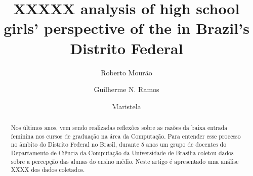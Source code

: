 \documentclass{llncs}
\begin{document}
%
\title{XXXXX analysis of high school girls' perspective of the in Brazil's Distrito Federal}%
%
\author{Roberto Mourão%
\and Guilherme N. Ramos \and Maristela}%
%
%

\maketitle%

\begin{abstract}%
Nos últimos anos, vem sendo realizadas reflexões sobre as razões da baixa entrada feminina nos cursos de graduação na área da Computação. Para entender esse processo no âmbito do Distrito Federal no Brasil, durante 5 anos um grupo de docentes do Departamento de Ciência da Computação da Universidade de Brasília coletou dados sobre a percepção das alunas do ensino médio. Neste artigo é apresentado uma análise XXXX dos dados coletados.%

%
\end{abstract}%

%
%
%
%
%

%
%
\end{document}
